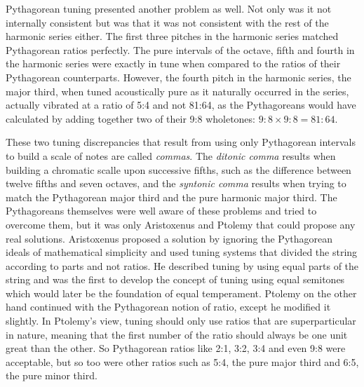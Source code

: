 Pythagorean tuning presented another problem as well.  Not only was it not internally consistent
but was that it was not consistent with the rest of the harmonic series either.
The first three pitches in the harmonic
series matched Pythagorean ratios perfectly.  The pure intervals of the octave,
fifth and fourth in the harmonic series were exactly in tune when compared to the
ratios of their Pythagorean counterparts. However, the fourth pitch in the
harmonic series, the major third, when tuned acoustically pure as it naturally
occurred in the series, actually vibrated at a ratio of 5:4 and not
81:64, as the Pythagoreans would have calculated by adding together two of
their 9:8 wholetones: $ 9:8 \times 9:8 = 81:64 $.

These two tuning discrepancies that result from using only Pythagorean intervals
to build a scale of notes are called \textit{commas}.  The \textit{ditonic comma}
results when building a chromatic scalle upon successive fifths,
such as the difference between twelve fifths
and seven octaves, and the \textit{syntonic comma} results when trying to match the
Pythagorean major third and the pure harmonic major third.  The
Pythagoreans themselves were well aware of these problems and tried to overcome them, but it
was only Aristoxenus and Ptolemy that could propose any real solutions.
Aristoxenus proposed a solution by ignoring the Pythagorean ideals of
mathematical simplicity and used tuning systems that divided the string
according to parts and not ratios.  He described tuning by using equal parts of
the string and was the first to develop the concept of tuning using equal
semitones which would later be the foundation of equal temperament.  Ptolemy on
the other hand continued with the Pythagorean notion of ratio, except he modified
it slightly.  In Ptolemy's view, tuning should only use ratios that are
superparticular in nature, meaning that the first number of the ratio should
always be one unit great than the other.  So Pythagorean ratios like 2:1, 3:2, 3:4
and even 9:8 were acceptable, but so too were other ratios such as 5:4, the pure
major third and 6:5, the pure minor third.

